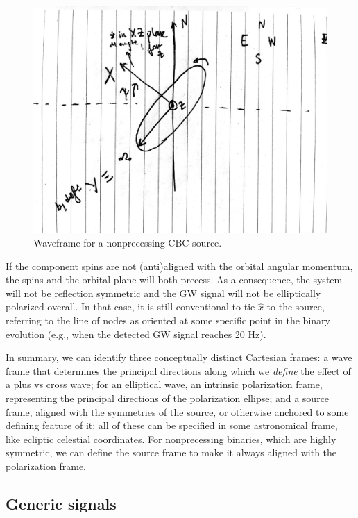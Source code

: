 \documentclass[aps,prd,twocolumn,superscriptaddress,preprintnumbers,floatfix,nofootinbib]{revtex4-2}
\begin{document}
\begin{figure}
\includegraphics[width=\columnwidth]{waveframe}
\caption{Waveframe for a nonprecessing CBC source.}
\label{fig:waveframe}
\end{figure}


If the component spins are not (anti)aligned with the orbital angular momentum, the spins and the orbital plane will both precess.
As a consequence, the system will not be reflection symmetric and the GW signal will not be elliptically polarized overall.
In that case, it is still conventional to tie $\hat{x}$ to the source, referring to the line of nodes as oriented at some specific point in the binary evolution (e.g., when the detected GW signal reaches 20 Hz).

In summary, we can identify three conceptually distinct Cartesian frames: a wave frame that determines the principal directions along which we \emph{define} the effect of a plus vs cross wave; for an elliptical wave, an intrinsic polarization frame, representing the principal directions of the polarization ellipse; and a source frame, aligned with the symmetries of the source, or otherwise anchored to some defining feature of it; all of these can be specified in some astronomical frame, like ecliptic celestial coordinates.
For nonprecessing binaries, which are highly symmetric, we can define the source frame to make it always aligned with the polarization frame.

\subsection{Generic signals}
\end{document}
